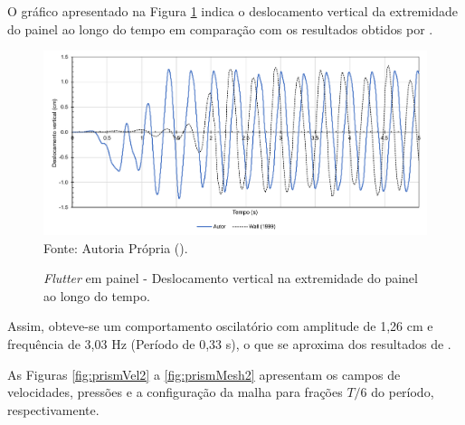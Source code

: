 O gráfico apresentado na Figura \ref{fig:prismRes} indica o deslocamento vertical da extremidade do painel ao longo do tempo em comparação com os resultados obtidos por .

\begin{figure}[h!]
    \centering
    \caption{\textit{Flutter} em painel - Deslocamento vertical na extremidade do painel ao longo do tempo.}
    \includegraphics[width=\linewidth]{Figuras/FSI-prism2/results.pdf}
    \\Fonte: Autoria Própria (\the\year).
    \label{fig:prismRes}
\end{figure}

Assim, obteve-se um comportamento oscilatório com amplitude de 1,26 cm e frequência de 3,03 Hz (Período de 0,33 s), o que se aproxima dos resultados de .

As Figuras \ref{fig:prismVel2} a \ref{fig:prismMesh2} apresentam os campos de velocidades, pressões e a configuração da malha para frações $T/6$ do período, respectivamente.

